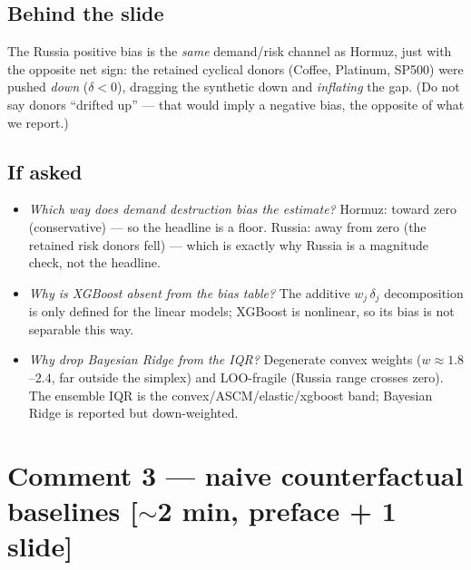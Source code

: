 \documentclass[11pt,a4paper]{article}
\newcommand{\timetag}[1]{\hfill\textcolor{muted}{\small[#1]}}
\begin{document}
\subsection{Behind the slide}
The Russia positive bias is the \emph{same} demand/risk channel as Hormuz, just with the opposite net
sign: the retained cyclical donors (Coffee, Platinum, SP500) were pushed \emph{down} ($\delta<0$),
dragging the synthetic down and \emph{inflating} the gap. (Do not say donors ``drifted up'' --- that
would imply a negative bias, the opposite of what we report.)

\subsection{If asked}
\begin{itemize}
  \item \textit{Which way does demand destruction bias the estimate?} Hormuz: toward zero (conservative)
    --- so the headline is a floor. Russia: away from zero (the retained risk donors fell) --- which is
    exactly why Russia is a magnitude check, not the headline.
  \item \textit{Why is XGBoost absent from the bias table?} The additive $w_j\,\delta_j$ decomposition is
    only defined for the linear models; XGBoost is nonlinear, so its bias is not separable this way.
  \item \textit{Why drop Bayesian Ridge from the IQR?} Degenerate convex weights ($w \approx 1.8$--$2.4$,
    far outside the simplex) and LOO-fragile (Russia range crosses zero). The ensemble IQR is the
    convex/ASCM/elastic/xgboost band; Bayesian Ridge is reported but down-weighted.
\end{itemize}

\section{Comment 3 --- naive counterfactual baselines \timetag{$\sim$2 min, preface + 1 slide}}
\end{document}
